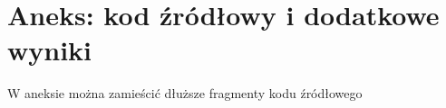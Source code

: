 \section{Aneks: kod źródłowy i dodatkowe wyniki}

W aneksie można zamieścić dłuższe fragmenty kodu źródłowego
